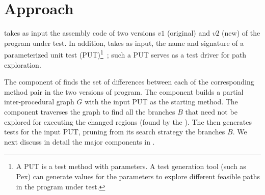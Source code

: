 \section{Approach}
\label{sec:approach}

 takes as input the assembly code of two versions $v1$ (original) and $v2$ (new) of the program under test. In addition,  takes as input, the name and signature of a parameterized unit test (PUT)\footnote{\scriptsize{A PUT is a test method with parameters. A test generation tool (such as Pex) can generate values for the parameters to explore different feasible paths in the program under test.}}~\cite{tillmann05:parameterized}; such a PUT serves as a test driver for path exploration.
 
The  component of  finds the set of differences between each of the corresponding method pair in the two versions of program. The  component builds a partial inter-procedural graph $G$ with the input PUT as the starting method. The  component traverses the graph to find all the branches $B$ that need not be explored for executing the changed regions (found by the ). The  then generates tests for the input PUT, pruning from its search strategy the branches $B$. We next discuss in detail the major components in .
